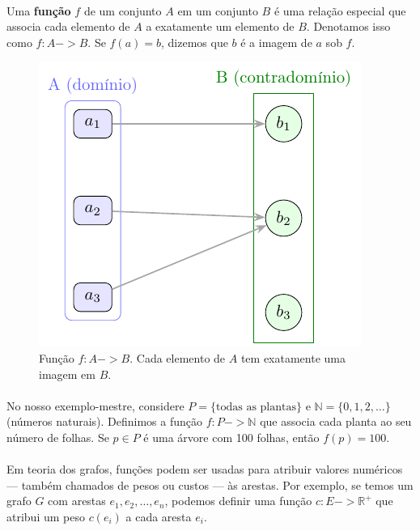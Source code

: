\documentclass[12pt,a4paper]{article}
\def\emph#1{#1}%
\def\to{->}%
\begin{document}
\paragraph{}
Uma \textbf{função} \(f\) de um conjunto \(A\) em um conjunto \(B\) é uma relação especial que associa cada elemento de \(A\) a exatamente um elemento de \(B\). Denotamos isso como \(f: A \to B\). Se \(f(a) = b\), dizemos que \(b\) é a imagem de \(a\) sob \(f\).


\begin{figure}[H]
    \centering
    \includegraphics[width=0.9\linewidth]{figures/fig_funcao.pdf}

    \caption{Função $f\!:\!A\to B$. Cada elemento de $A$ tem \emph{exatamente uma} imagem em $B$.}
    \label{fig:funcao}
\end{figure}


\paragraph{}
No nosso exemplo-mestre, considere \(P=\{\text{todas as plantas}\}\) e \(\mathbb{N}=\{0,1,2,\ldots\}\) (números naturais). Definimos a função \(f: P \to \mathbb{N}\) que associa cada planta ao seu número de folhas. Se \(p \in P\) é uma árvore com 100 folhas, então \(f(p) = 100\).

\paragraph{}
Em teoria dos grafos, funções podem ser usadas para atribuir valores numéricos --- também chamados de pesos ou custos --- às arestas. Por exemplo, se temos um grafo \(G\) com arestas \(e_1, e_2, \ldots, e_n\), podemos definir uma função \(c: E \to \mathbb{R}^+\) que atribui um peso \(c(e_i)\) a cada aresta \(e_i\).
\end{document}
